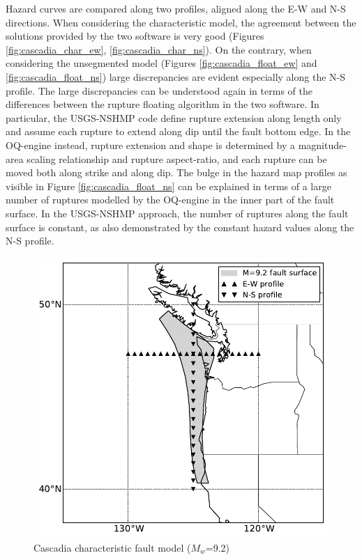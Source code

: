 Hazard curves are compared along two profiles, aligned along the E-W and N-S directions. When considering the characteristic model, the agreement between the solutions provided by the two software is very good (Figures \ref{fig:cascadia_char_ew}, \ref{fig:cascadia_char_ns}). On the contrary, when considering the unsegmented model (Figures \ref{fig:cascadia_float_ew} and \ref{fig:cascadia_float_ns}) large discrepancies are evident especially along the N-S profile. The large discrepancies can be understood again in terms of the differences between the rupture floating algorithm in the two software. In particular, the USGS-NSHMP code define rupture extension along length only and assume each rupture to extend along dip until the fault bottom edge. In the OQ-engine instead, rupture extension and shape is determined by a magnitude-area scaling relationship and rupture aspect-ratio, and each rupture can be moved both along strike and along dip. The bulge in the hazard map profiles as visible in Figure \ref{fig:cascadia_float_ns} can be explained in terms of a large number of ruptures modelled by the OQ-engine in the inner part of the fault surface. In the USGS-NSHMP approach, the number of ruptures along the fault surface is constant, as also demonstrated by the constant hazard values along the N-S profile.
\begin{figure}
\centering
\includegraphics[width=12cm]{./qareport/pictures/cascadia_char.pdf}
\caption{Cascadia characteristic fault model ($M_{w}$=9.2)}
\label{fig:cascadia_geo}
\end{figure}


